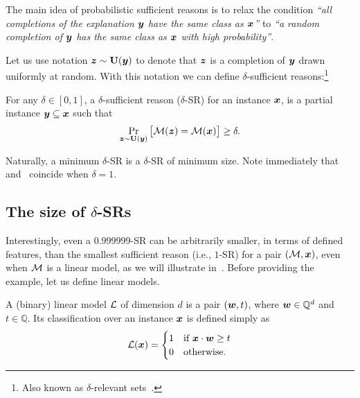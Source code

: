The main idea of probabilistic sufficient reasons is to relax the condition \emph{``all completions of the explanation ${\bm{y}}$ have the same class as ${\bm{x}}$''} to \emph{``a random completion of ${\bm{y}}$ has the same class as ${\bm{x}}$ with high probability''}.

 Let us use notation ${\bm{z}} \sim \mathbf{U}({\bm{y}})$ to denote that ${\bm{z}}$ is a completion of ${\bm{y}}$ drawn uniformly at random.
With this notation we can define $\delta$-sufficient reasons:\footnote{Also known as $\delta$-relevant sets~\cite{Izza2021EfficientEW,Waldchen_MacDonald_Hauch_Kutyniok_2021}.}
\begin{definition}
	For any $\delta \in [0, 1]$, a $\delta$-sufficient reason ($\delta$-SR) for an instance ${\bm{x}}$, is a partial instance ${\bm{y}} \subseteq {\bm{x}}$ such that
	\[
		\Pr_{{\bm{z}} \sim  \mathbf{U}({\bm{y}})}\big[\mathcal{M}({\bm{z}}) = \mathcal{M}({\bm{x}})\big] \geq \delta.
	\]
	\label{def:delta-SR}
\end{definition}
%
Naturally, a minimum $\delta$-SR is a $\delta$-SR of minimum size. Note immediately that~ and~ coincide when $\delta = 1$.
\subsection{The size of $\delta$-SRs}

Interestingly, even a $0.999999$-SR can be arbitrarily smaller, in terms of defined features, than the smallest sufficient reason (i.e., $1$-SR) for a pair $(\mathcal{M}, {\bm{x}})$, even when $\mathcal{M}$ is a linear model, as we will illustrate in~. Before providing the example, let us define linear models.

\begin{definition}
	A (binary) linear model $\mathcal{L}$ of dimension $d$ is a pair $({\bm{w}}, t)$, where ${\bm{w}} \in \mathbb{Q}^d$ and $t \in \mathbb{Q}$. Its classification over an instance ${\bm{x}}$ is defined simply as 
	\[
		\mathcal{L}({\bm{x}}) = \begin{cases}
			1 & \text{if } {\bm{x}} \cdot {\bm{w}} \geq t\\
			0 & \text{otherwise}.
		\end{cases}
	\]
	\label{def:linear-models}
\end{definition}

